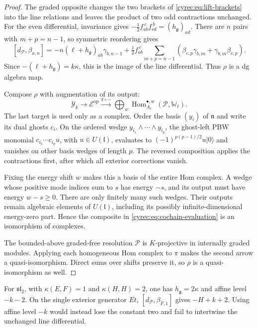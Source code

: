 \begin{proof}
The graded opposite changes the two brackets of
\eqref{cyrec:eq:lift-brackets} into the line relations and leaves
the product of two odd contractions unchanged.
For the even differential, invariance gives
$-\tfrac12f_{ab}^{\ c}f_{cd}^{\ b}=(h_{\mathfrak g})_{ad}$.
There are $n$ pairs with $m+p=n-1$, so symmetric reordering gives
\[
 [d_{\mathcal P},\beta_{a,n}]
 =-n(\ell+h_{\mathfrak g})_{ab}\gamma_{b,n-1}
   +\tfrac12 f_{ab}^{\ c}\sum_{m+p=n-1}
       (\beta_{c,p}\gamma_{b,m}+\gamma_{b,m}\beta_{c,p}).
\]
Since $-(\ell+h_{\mathfrak g})=k\kappa$, this is the image of
the line differential. Thus $\rho$ is a dg algebra map.

Compose $\rho$ with augmentation of its output:
\begin{equation}\label{cyrec:eq:cochain-evaluation}
 \mathcal Y_k\longrightarrow\mathcal E^{\mathrm{op}}
 \xrightarrow{\pi\circ-}
 \bigoplus_w\operatorname{Hom}^{\bullet,w}_{A_\ell}
                         (\mathcal P,\mathbb W_\ell).
\end{equation}
The last target is used only as a complex.
Order the basis $(y_i)$ of $\mathfrak n$ and write its dual
ghosts $c_i$. On the ordered wedge
$y_{i_1}\wedge\cdots\wedge y_{i_p}$, the ghost-left PBW
monomial $c_{i_1}\cdots c_{i_p}u$, with
$u\in U(\mathfrak l)$, evaluates to
$(-1)^{p(p-1)/2}u|0\rangle$ and vanishes on other basis wedges
of length $p$.
The reversed composition applies the contractions first, after
which all exterior corrections vanish.

Fixing the energy shift $w$ makes this a basis of the entire
Hom complex. A wedge whose positive mode indices sum to $s$ has
energy $-s$, and its output must have energy $w-s\geq0$.
There are only finitely many such wedges. Their outputs remain
algebraic elements of $U(\mathfrak l)$, including its possibly
infinite-dimensional energy-zero part.
Hence the composite in \eqref{cyrec:eq:cochain-evaluation} is
an isomorphism of complexes.

The bounded-above graded-free resolution $\mathcal P$ is
$K$-projective in internally graded modules. Applying each
homogeneous Hom complex to $\pi$ makes the second arrow a
quasi-isomorphism. Direct sums over shifts preserve it, so $\rho$
is a quasi-isomorphism as well.
\end{proof}

For $\mathfrak{sl}_2$, with $\kappa(E,F)=1$ and
$\kappa(H,H)=2$, one has $h_{\mathfrak g}=2\kappa$ and
affine level $-k-2$. On the single exterior generator $Et$,
$[d_{\mathcal P},\beta_{F,1}]$ gives $-H+k+2$.
Using affine level $-k$ would instead lose the constant two and
fail to intertwine the unchanged line differential.

